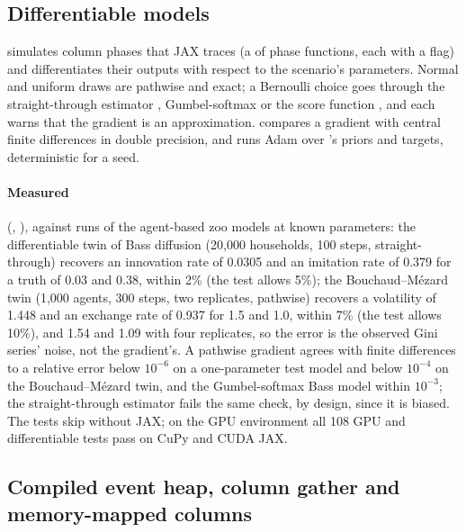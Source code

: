 \subsection{Differentiable models}
\label{app:diff}

 simulates column phases that JAX traces (a  of phase
functions, each with a  flag) and differentiates their outputs with
respect to the scenario's parameters. Normal and uniform draws are pathwise and exact; a Bernoulli choice
goes through the straight-through estimator \citep{bengio2013estimating}, Gumbel-softmax
\citep{jang2017categorical, maddison2017concrete} or the score function
\citep{williams1992simple}, and each warns that the gradient is an approximation.
 compares a gradient with central finite differences in double
precision, and  runs Adam \citep{kingma2015adam} over
's priors and targets, deterministic for a seed.

\paragraph{Measured} (, ), against runs of the
agent-based zoo models at known parameters: the differentiable twin of Bass diffusion (20,000
households, 100 steps, straight-through) recovers an innovation rate of 0.0305 and an
imitation rate of 0.379 for a truth of 0.03 and 0.38, within 2\% (the test allows 5\%); the
Bouchaud--Mézard twin (1,000 agents, 300 steps, two replicates, pathwise) recovers a
volatility of 1.448 and an exchange rate of 0.937 for 1.5 and 1.0, within 7\% (the test allows
10\%), and 1.54 and 1.09 with four replicates, so the error is the observed Gini series'
noise, not the gradient's. A pathwise gradient agrees with finite differences to a relative error below $10^{-6}$ on a
one-parameter test model and below $10^{-4}$ on the Bouchaud--Mézard twin, and the
Gumbel-softmax Bass model within $10^{-3}$; the straight-through
estimator fails the same check, by design, since it is biased. The tests skip without JAX;
on the GPU environment all 108 GPU and differentiable tests pass on CuPy and CUDA JAX.

\subsection{Compiled event heap, column gather and memory-mapped columns}
\label{app:perf2}

